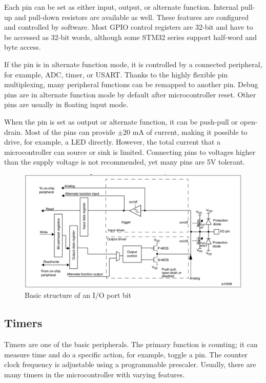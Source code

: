 Each pin can be set as either input, output, or alternate function. Internal pull-up and pull-down resistors are available as well. These features are configured and controlled by software. Most GPIO control registers are 32-bit and have to be accessed as 32-bit words, although some STM32 series support half-word and byte access.

If the pin is in alternate function mode, it is controlled by a connected peripheral, for example, ADC, timer, or USART. Thanks to the highly flexible pin multiplexing, many peripheral functions can be remapped to another pin. Debug pins are in alternate function mode by default after microcontroller reset. Other pins are usually in floating input mode.

When the pin is set as output or alternate function, it can be push-pull or open-drain. Most of the pins can provide $\pm20 \text{ mA}$ of current, making it possible to drive, for example, a LED directly. However, the total current that a microcontroller can source or sink is limited. Connecting pins to voltages higher than the supply voltage is not recommended, yet many pins are 5V tolerant.
\begin{figure}
\centering
\includegraphics[width=0.9\linewidth]{support/pic/io_port.png}
\caption{Basic structure of an I/O port bit \cite{f303_ref}} %
\label{fig:gpio}
\end{figure}

	\subsection{Timers}
	\label{sub:timers}
Timers are one of the basic peripherals. The primary function is counting; it can measure time and do a specific action, for example, toggle a pin. The counter clock frequency is adjustable using a programmable prescaler. Usually, there are many timers in the microcontroller with varying features.

